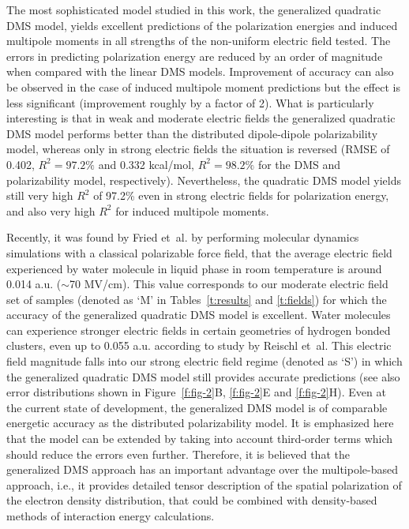 \documentclass[aip,amsmath,amssymb,reprint,floatfix]{revtex4-1}
\begin{document}
The most sophisticated model studied in this work, the generalized quadratic DMS model, yields excellent predictions 
of the polarization energies and induced multipole moments in all strengths of the non\hyp{}uniform electric field tested.
The errors in predicting polarization energy are reduced by an order of magnitude when compared with
the linear DMS models. Improvement of accuracy can also be observed in the case of induced multipole moment predictions
but the effect is less significant (improvement roughly by a factor of 2).
What is particularly interesting is that in weak and moderate electric fields
the generalized quadratic DMS model performs better than the distributed dipole\hyp{}dipole
polarizability model, whereas only in strong electric fields the situation is reversed
(RMSE of 0.402, $R^2=97.2\%$ and 0.332 kcal/mol, $R^2=98.2\%$ for the DMS and polarizability model, respectively).
Nevertheless, the quadratic DMS model yields still very high $R^2$ of 97.2\% even in strong electric fields for polarization
energy, and also very high $R^2$ for induced multipole moments.

Recently, it was found by Fried et~al. by performing molecular dynamics simulations with a classical 
polarizable force field, that the average electric field experienced by water molecule in liquid phase
in room temperature is around 0.014 a.u. ($\sim$70 MV/cm).\cite{Fried.Wang.Boxer.Ren.Pande.JPCB.2013}
This value corresponds to our moderate electric field set of samples (denoted as `M' in Tables~\ref{t:results}
and \ref{t:fields}) for which the
accuracy of the generalized quadratic DMS model is excellent.
Water molecules can experience
stronger electric fields in certain geometries of hydrogen bonded clusters, 
even up to 0.055 a.u. according to study by Reischl et~al.\cite{Reischl.Kofinger.Dellago.MolPhys.2009} 
This electric field magnitude falls into our strong electric field regime (denoted as `S')
in which the generalized quadratic
DMS model still provides accurate predictions (see also error distributions 
shown in Figure~\ref{f:fig-2}B, \ref{f:fig-2}E and \ref{f:fig-2}H). 
Even at the current state of development, the generalized DMS model
is of comparable energetic accuracy as the distributed polarizability model. 
It is emphasized here that the model can be extended by taking into account
third\hyp{}order terms which should reduce the errors even further.
Therefore, it is believed that
the generalized DMS approach
has an important advantage over the multipole\hyp{}based approach, i.e., it provides detailed
tensor description of the spatial polarization of the electron density distribution, that could be
combined with density\hyp{}based methods of interaction energy calculations.\cite{Mandado.Hermida-Ramon.JCTC.2011}
\end{document}
